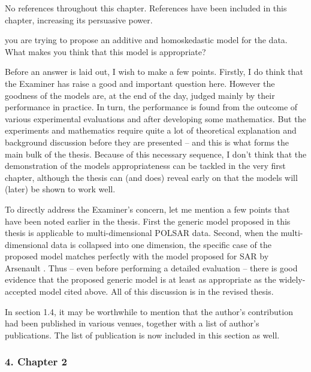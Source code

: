 \replyToComment
    {No references throughout this chapter.}
    {References have been included in this chapter, increasing its persuasive power.}

\replyToComment
    {you are trying to propose an additive and homoskedastic model for the data. What makes you think that this model is appropriate?}
    {Before an answer is laid out, I wish to make a few points.
Firstly, I do think that the Examiner has raise a good and important question here.
However the goodness of the models are, at the end of the day, judged mainly by their performance in practice. In turn, the performance is found from the outcome of various experimental evaluations and after developing some mathematics. But the experiments and mathematics require quite a lot of theoretical explanation and background discussion before they are presented -- and this is what forms the main bulk of the thesis. 
Because of this necessary sequence, I don't think that the demonstration of the models appropriateness can be tackled in the very first chapter, although the thesis can (and does) reveal early on that the models will (later) be shown to work well.

To directly address the Examiner's concern, let me mention a few points that have been noted earlier in the thesis.
First the generic model proposed in this thesis is applicable to multi-dimensional POLSAR data.
Second, when the multi-dimensional data is collapsed into one dimension, 
  the specific case of the proposed model matches perfectly with the model proposed for SAR by Arsenault \cite{Arsenault_JOptSocAm_1976}. 
Thus -- even before performing a detailed evaluation -- there is good evidence that the proposed generic model is at least as appropriate as the widely-accepted model cited above.
All of this discussion is in the revised thesis.
}

\replyToComment
    {In section 1.4, it may be worthwhile to mention that the author's contribution had been published in various venues, together with a list of author's publications.}
    {The list of publication is now included in this section as well.}

\subsubsection*{4. Chapter 2}

